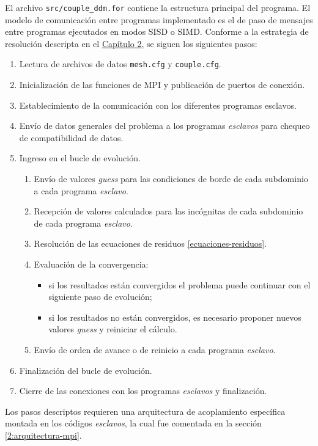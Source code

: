 El archivo \texttt{src/couple\_ddm.for} contiene la estructura principal del programa.
El modelo de comunicación entre programas implementado es el de paso de mensajes entre programas ejecutados en modos SISD o SIMD.
Conforme a la estrategia de resolución descripta en el \hyperlink{chapter.2}{Capítulo 2}, se siguen los siguientes pasos:
\begin{enumerate}
\item Lectura de archivos de datos \texttt{mesh.cfg} y \texttt{couple.cfg}.
\item Inicialización de las funciones de MPI y publicación de puertos de conexión.
\item Establecimiento de la comunicación con los diferentes programas esclavos.
\item Envío de datos generales del problema a los programas \textit{esclavos} para chequeo de compatibilidad de datos.
\item Ingreso en el bucle de evolución.
\begin{enumerate}
\item Envío de valores \textit{guess} para las condiciones de borde de cada subdominio a cada programa \textit{esclavo}.
\item Recepción de valores calculados para las incógnitas de cada subdominio de cada programa \textit{esclavo}.
\item Resolución de las ecuaciones de residuos \ref{ecuaciones-residuos}.
\item Evaluación de la convergencia:
\begin{itemize}
\item si los resultados están convergidos el problema puede continuar con el siguiente paso de evolución;
\item si los resultados no están convergidos, es necesario proponer nuevos valores \textit{guess} y reiniciar el cálculo.
\end{itemize}
\item Envío de orden de avance o de reinicio a cada programa \textit{esclavo}.
\end{enumerate}
\item Finalización del bucle de evolución.
\item Cierre de las conexiones con los programas \textit{esclavos} y finalización.
\end{enumerate}
Los pasos descriptos requieren una arquitectura de acoplamiento específica montada en los códigos \textit{esclavos}, la cual fue comentada en la sección \ref{2:arquitectura-mpi}.

